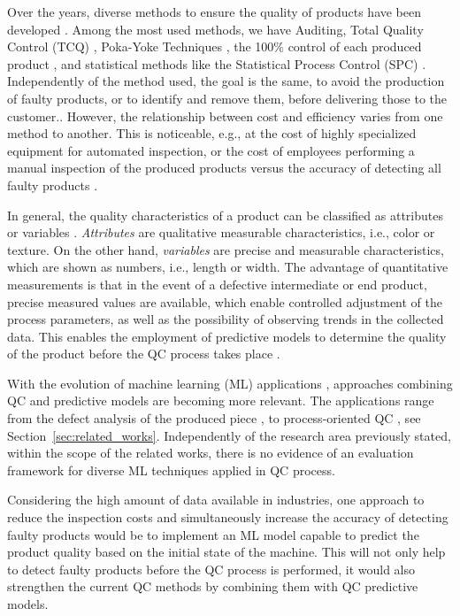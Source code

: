 \documentclass[5p,times,procedia]{elsarticle}
\begin{document}
Over the years, diverse methods to ensure the quality of products have been developed \cite{mitra2016fundamentals}.
Among the most used methods, we have Auditing, Total Quality Control (TCQ) \cite{illes2017new}, Poka-Yoke Techniques \cite{robinson1997using}, the 100\% control of each produced product \cite{Hinckley1997QC}, and statistical methods like the Statistical Process Control (SPC) \cite{selvamuthu2018introduction}.
Independently of the method used, the goal is the same, to avoid the production of faulty products, or to identify and remove them, before delivering those to the customer.\cite{mitra2016fundamentals}.
However, the relationship between cost and efficiency varies from one method to another. This is noticeable, e.g., at the cost of highly specialized equipment for automated inspection, or the cost of employees performing a manual inspection of the produced products versus the accuracy of detecting all faulty products \cite{Diego1998QCCost}.

In general, the quality characteristics of a product can be classified as attributes or variables \cite{mitra2016fundamentals}. 
\textit{Attributes} are qualitative measurable characteristics, i.e., color or texture. On the other hand, \textit{variables} are precise and measurable characteristics, which are shown as numbers, i.e., length or width. 
The advantage of quantitative measurements is that in the event of a defective intermediate or end product, precise measured values are available, which enable controlled adjustment of the process parameters, as well as the possibility of observing trends in the collected data. This  enables the employment of predictive models to determine the quality of the product before the QC process takes place \cite{bishop2006pattern, krauss2019machine}.

With the evolution of machine learning (ML) applications \cite{bishop2006pattern, Burggraef2018AIinprod}, approaches combining QC and predictive models are becoming more relevant. The applications range from the defect analysis of the produced piece \cite{Carlos2018MLforQC, Sohnius2019PASurfacequality}, to process-oriented QC \cite{krauss2020automated, krauss2019machine, aumi2012model, ritter1992neue}, see Section~\ref{sec:related_works}. 
Independently of the research area previously stated, within the scope of the related works, there is no evidence of an evaluation framework for diverse ML techniques applied in QC process.

Considering the high amount of data available in industries, one approach to reduce the inspection costs and simultaneously  increase the accuracy of detecting faulty products would be to implement an ML model capable to predict the product quality based on the initial state of the machine. This will not only help to detect faulty products before the QC process is performed, it would also strengthen the current QC methods by combining them with QC predictive models.
\end{document}
